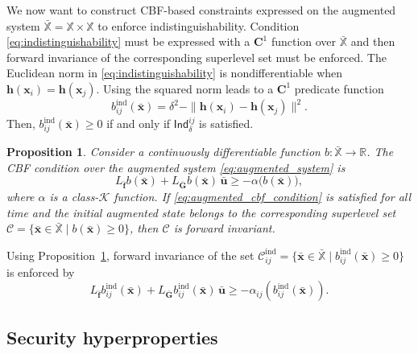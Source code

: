 \documentclass[journal,twoside,web]{ieeecolor}
\newtheorem{proposition}[theorem]{Proposition}
\begin{document}
We now want to construct CBF-based constraints expressed on the augmented system $\bar{\mathbb{X}} = \mathbb{X} \times \mathbb{X}$ to enforce indistinguishability. Condition \eqref{eq:indistinguishability} must be expressed with a $\mathbf{C}^1$ function over $\bar{\mathbb{X}}$ and then forward invariance of the corresponding superlevel set must be enforced. The Euclidean norm in \eqref{eq:indistinguishability} is nondifferentiable when $\mathbf{h}(\mathbf{x}_i) = \mathbf{h}(\mathbf{x}_j)$. Using the squared norm leads to a $\mathbf{C}^1$ predicate function
\begin{equation} \label{eq:ind_cbf}
    b_{ij}^{\mathrm{ind}}(\bar{\mathbf{x}}) = \delta^2 - \| \mathbf{h}(\mathbf{x}_i) - \mathbf{h}(\mathbf{x}_j)\|^2 .
\end{equation}
Then, $b_{ij}^{\mathrm{ind}}(\bar{\mathbf{x}})\ge 0$ if and only if $\mathsf{Ind}_{\delta}^{ij}$ is satisfied. 
\begin{proposition} \label{prop:forward_invariance}
    Consider a continuously differentiable function $b: \bar{\mathbb{X}} \to \mathbb{R}$. The CBF condition over the augmented system \eqref{eq:augmented_system} is
    \begin{equation}
    \label{eq:augmented_cbf_condition}
        L_{\bar{\mathbf{f}}} b(\bar{\mathbf{x}}) + L_{\bar{\mathbf{G}}} b(\bar{\mathbf{x}}) \, \bar{\mathbf{u}} \ge -\alpha \big( b(\bar{\mathbf{x}}) \big),
    \end{equation}
    where $\alpha$ is a class-$\mathcal{K}$ function. If \eqref{eq:augmented_cbf_condition} is satisfied for all time and the initial augmented state belongs to the corresponding superlevel set $\mathcal{C} = \big\{ \bar{\mathbf{x}} \in \bar{\mathbb{X}} \mid b(\bar{\mathbf{x}})\ge 0 \big\}$, then $\mathcal{C}$ is forward invariant.
\end{proposition}

Using Proposition~\ref{prop:forward_invariance}, forward invariance of the set $\mathcal{C}_{ij}^{\mathrm{ind}} = \big\{ \bar{\mathbf{x}} \in \bar{\mathbb{X}} \mid b_{ij}^{\mathrm{ind}}(\bar{\mathbf{x}})\ge 0 \big\}$ is enforced by
\begin{equation}
\label{eq:ind_cbf_constraint}
    L_{\bar{\mathbf{f}}} b_{ij}^{\mathrm{ind}}(\bar{\mathbf{x}}) + L_{\bar{\mathbf{G}}} b_{ij}^{\mathrm{ind}}(\bar{\mathbf{x}}) \, \bar{\mathbf{u}} \ge -\alpha_{ij} \! \left( b_{ij}^{\mathrm{ind}} (\bar{\mathbf{x}}) \right).
\end{equation}

\subsection{Security hyperproperties} \label{subsec:security}
\end{document}
